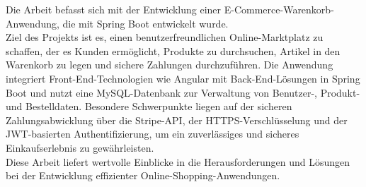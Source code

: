 \kurzfassung

Die Arbeit befasst sich mit der Entwicklung einer E-Commerce-Warenkorb-Anwendung, die mit Spring Boot entwickelt wurde. \\
Ziel des Projekts ist es, einen benutzerfreundlichen Online-Marktplatz zu schaffen, der es Kunden ermöglicht, Produkte zu durchsuchen, Artikel in den Warenkorb zu legen und sichere Zahlungen durchzuführen. Die Anwendung integriert Front-End-Technologien wie Angular mit Back-End-Lösungen in Spring Boot und nutzt eine MySQL-Datenbank zur Verwaltung von Benutzer-, Produkt- und Bestelldaten. Besondere Schwerpunkte liegen auf der sicheren Zahlungsabwicklung über die Stripe-API, der HTTPS-Verschlüsselung und der JWT-basierten Authentifizierung, um ein zuverlässiges und sicheres Einkaufserlebnis zu gewährleisten. \\
Diese Arbeit liefert wertvolle Einblicke in die Herausforderungen und Lösungen bei der Entwicklung effizienter Online-Shopping-Anwendungen.


